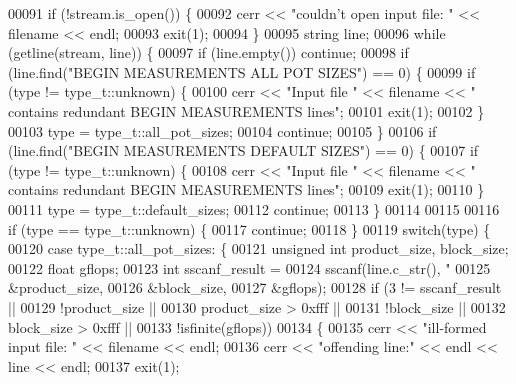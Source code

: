 \begin{DoxyCode}
00091     \textcolor{keywordflow}{if} (!stream.is\_open()) \{
00092       cerr << \textcolor{stringliteral}{"couldn't open input file: "} << filename << endl;
00093       exit(1);
00094     \}
00095     \textcolor{keywordtype}{string} line;
00096     \textcolor{keywordflow}{while} (getline(stream, line)) \{
00097       \textcolor{keywordflow}{if} (line.empty()) \textcolor{keywordflow}{continue};
00098       \textcolor{keywordflow}{if} (line.find(\textcolor{stringliteral}{"BEGIN MEASUREMENTS ALL POT SIZES"}) == 0) \{
00099         \textcolor{keywordflow}{if} (type != type\_t::unknown) \{
00100           cerr << \textcolor{stringliteral}{"Input file "} << filename << \textcolor{stringliteral}{" contains redundant BEGIN MEASUREMENTS lines"};
00101           exit(1);
00102         \}
00103         type = type\_t::all\_pot\_sizes;
00104         \textcolor{keywordflow}{continue};
00105       \}
00106       \textcolor{keywordflow}{if} (line.find(\textcolor{stringliteral}{"BEGIN MEASUREMENTS DEFAULT SIZES"}) == 0) \{
00107         \textcolor{keywordflow}{if} (type != type\_t::unknown) \{
00108           cerr << \textcolor{stringliteral}{"Input file "} << filename << \textcolor{stringliteral}{" contains redundant BEGIN MEASUREMENTS lines"};
00109           exit(1);
00110         \}
00111         type = type\_t::default\_sizes;
00112         \textcolor{keywordflow}{continue};
00113       \}
00114       
00115 
00116       \textcolor{keywordflow}{if} (type == type\_t::unknown) \{
00117         \textcolor{keywordflow}{continue};
00118       \}
00119       \textcolor{keywordflow}{switch}(type) \{
00120         \textcolor{keywordflow}{case} type\_t::all\_pot\_sizes: \{
00121           \textcolor{keywordtype}{unsigned} \textcolor{keywordtype}{int} product\_size, block\_size;
00122           \textcolor{keywordtype}{float} gflops;
00123           \textcolor{keywordtype}{int} sscanf\_result =
00124             sscanf(line.c\_str(), \textcolor{stringliteral}{"%
00125                    &product\_size,
00126                    &block\_size,
00127                    &gflops);
00128           \textcolor{keywordflow}{if} (3 != sscanf\_result ||
00129               !product\_size ||
00130               product\_size > 0xfff ||
00131               !block\_size ||
00132               block\_size > 0xfff ||
00133               !isfinite(gflops))
00134           \{
00135             cerr << \textcolor{stringliteral}{"ill-formed input file: "} << filename << endl;
00136             cerr << \textcolor{stringliteral}{"offending line:"} << endl << line << endl;
00137             exit(1);
}
\end{DoxyCode}
